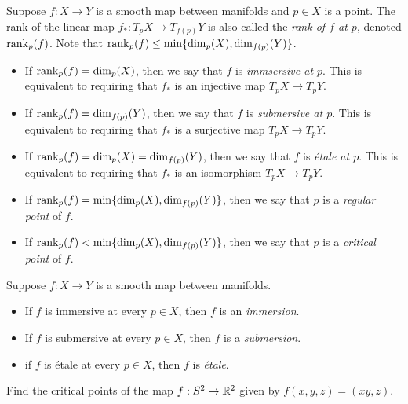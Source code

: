 \begin{definition} 
	Suppose $f : X \to Y$ is a smooth map between manifolds and $p \in X$ is a point. The rank of the linear map $f_* : T_p X \to T_{f(p)} Y$ is also called the \emph{rank of $f$ at $p$}, denoted $\operatorname{rank}_p(f)$. Note that $\operatorname{rank}_p(f) \leq \min\{\dim_p(X),\dim_{f(p)}(Y) \}$.
	\begin{itemize}
		\item If $\operatorname{rank}_p(f) = \dim_{p} (X)$, then we say that $f$ is \emph{immsersive at $p$}. This is equivalent to requiring that $f_*$ is an injective map $T_p X \to T_p Y$.  
		\item If $\operatorname{rank}_p(f) = \dim_{f(p)} (Y)$, then we say that $f$ is \emph{submersive at $p$}. This is equivalent to requiring that $f_*$ is a surjective map $T_p X \to T_p Y$. 
		\item If $\operatorname{rank}_p(f) =  \dim_p(X) = \dim_{f(p)} (Y)$, then we say that $f$ is \emph{\'etale at $p$}. This is equivalent to requiring that $f_*$ is an isomorphism $T_p X \to T_p Y$. 
		\item If $\operatorname{rank}_p(f) = \min\{\dim_p(X),\dim_{f(p)}(Y) \}$, then we say that $p$ is a \emph{regular point} of $f$. 
		\item If $\operatorname{rank}_p(f) < \min\{\dim_p(X),\dim_{f(p)}(Y) \}$, then we say that $p$ is a \emph{critical point} of $f$.
	\end{itemize}
\end{definition}

\begin{definition}
	Suppose $f : X \to Y$ is a smooth map between manifolds.
	\begin{itemize}
		\item If $f$ is immersive at every $p \in X$, then $f$ is an \emph{immersion}. 
		\item If $f$ is submersive at every $p \in X$, then $f$ is a \emph{submersion}. 
		\item if $f$ is \'etale at every $p \in X$, then $f$ is \emph{\'etale}. 
	\end{itemize}
\end{definition}

\begin{exercise}
	Find the critical points of the map $f : S^2 \to \mathbb{R}^2$ given by $f(x,y,z) = (xy, z)$. 
\end{exercise}